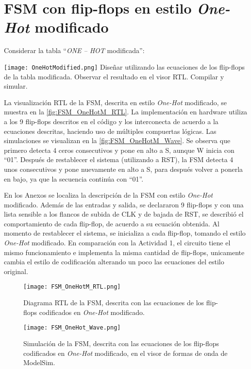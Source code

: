 \section{FSM con flip-flops en estilo \textit{One-Hot} modificado \label{sec:s2}}

\begin{center}
	\begin{minipage}{12cm}
		\begin{tcolorbox}[title=Actividad 2]
			Considerar la tabla ``\textit{ONE – HOT} modificada'':\enter
			
				\texttt{[image: OneHotModified.png]}
			Diseñar utilizando las ecuaciones de los flip-flops de la tabla modificada. Observar el resultado en el visor RTL. Compilar y simular.
		\end{tcolorbox}	
	\end{minipage}
\end{center}

La visualización RTL de la FSM, descrita en estilo \textit{One-Hot} modificado, se muestra en la \autoref{fig:FSM_OneHotM_RTL}. La implementación en hardware utiliza a los 9 flip-flops descritos en el código y los interconecta de acuerdo a la ecuaciones descritas, haciendo uso de múltiples compuertas lógicas. Las simulaciones se visualizan en la \autoref{fig:FSM_OneHotM_Wave}. Se observa que primero detecta 4 ceros consecutivos y pone en alto a S, aunque W inicia con ``01''. Después de restablecer el sistema (utilizando a RST), la FSM detecta 4 unos consecutivos y pone nuevamente en alto a S, para después volver a ponerla en bajo, ya que la secuencia continúa con ``01''.

En los Anexos se localiza la descripción de la FSM con estilo \textit{One-Hot} modificado. Además de las entradas y salida, se declararon 9 flip-flops y con una lista sensible a los flancos de subida de CLK y de bajada de RST, se describió el comportamiento de cada flip-flop, de acuerdo a su ecuación obtenida. Al momento de restablecer el sistema, se inicializa a cada flip-flop, tomando el estilo \textit{One-Hot} modificado. En comparación con la Actividad 1, el circuito tiene el mismo funcionamiento e implementa la misma cantidad de flip-flops, unicamente cambia el estilo de codificación alterando un poco las ecuaciones del estilo original.

\begin{figure}[ht]
	\centering
	\texttt{[image: FSM\_OneHotM\_RTL.png]}
	\caption{Diagrama RTL de la FSM, descrita con las ecuaciones de los flip-flops codificados en \textit{One-Hot} modificado. \label{fig:FSM_OneHotM_RTL}}
\end{figure}

\begin{figure}[ht]
	\centering
	\texttt{[image: FSM\_OneHot\_Wave.png]}
	\caption{Simulación de la FSM, descrita con las ecuaciones de los flip-flops codificados en \textit{One-Hot} modificado, en el visor de formas de onda de ModelSim. \label{fig:FSM_OneHotM_Wave}}
\end{figure}